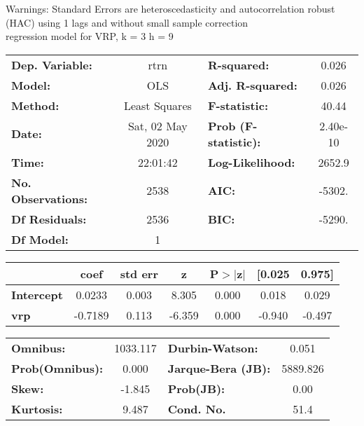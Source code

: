 Warnings: \newline
 [1] Standard Errors are heteroscedasticity and autocorrelation robust (HAC) using 1 lags and without small sample correction\\ 

regression model for VRP, k = 3 h = 9\begin{center}
\begin{tabular}{lclc}
\toprule
\textbf{Dep. Variable:}    &       rtrn       & \textbf{  R-squared:         } &     0.026   \\
\textbf{Model:}            &       OLS        & \textbf{  Adj. R-squared:    } &     0.026   \\
\textbf{Method:}           &  Least Squares   & \textbf{  F-statistic:       } &     40.44   \\
\textbf{Date:}             & Sat, 02 May 2020 & \textbf{  Prob (F-statistic):} &  2.40e-10   \\
\textbf{Time:}             &     22:01:42     & \textbf{  Log-Likelihood:    } &    2652.9   \\
\textbf{No. Observations:} &        2538      & \textbf{  AIC:               } &    -5302.   \\
\textbf{Df Residuals:}     &        2536      & \textbf{  BIC:               } &    -5290.   \\
\textbf{Df Model:}         &           1      & \textbf{                     } &             \\
\bottomrule
\end{tabular}
\begin{tabular}{lcccccc}
                   & \textbf{coef} & \textbf{std err} & \textbf{z} & \textbf{P$> |$z$|$} & \textbf{[0.025} & \textbf{0.975]}  \\
\midrule
\textbf{Intercept} &       0.0233  &        0.003     &     8.305  &         0.000        &        0.018    &        0.029     \\
\textbf{vrp}       &      -0.7189  &        0.113     &    -6.359  &         0.000        &       -0.940    &       -0.497     \\
\bottomrule
\end{tabular}
\begin{tabular}{lclc}
\textbf{Omnibus:}       & 1033.117 & \textbf{  Durbin-Watson:     } &    0.051  \\
\textbf{Prob(Omnibus):} &   0.000  & \textbf{  Jarque-Bera (JB):  } & 5889.826  \\
\textbf{Skew:}          &  -1.845  & \textbf{  Prob(JB):          } &     0.00  \\
\textbf{Kurtosis:}      &   9.487  & \textbf{  Cond. No.          } &     51.4  \\
\bottomrule
\end{tabular}
\end{center}

